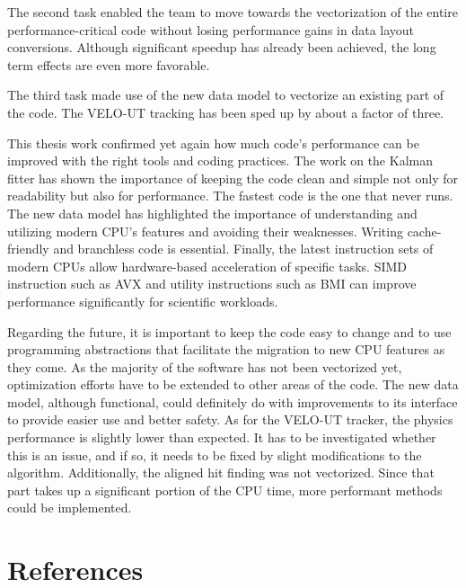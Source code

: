 \documentclass[12pt]{article}
\begin{document}
The second task enabled the team to move towards the vectorization of the entire performance-critical code without losing performance gains in data layout conversions. Although significant speedup has already been achieved, the long term effects are even more favorable.

The third task made use of the new data model to vectorize an existing part of the code. The VELO-UT tracking has been sped up by about a factor of three.
\vspace{1pc}

This thesis work confirmed yet again how much code's performance can be improved with the right tools and coding practices. The work on the Kalman fitter has shown the importance of keeping the code clean and simple not only for readability but also for performance. The fastest code is the one that never runs. The new data model has highlighted the importance of understanding and utilizing modern CPU's features and avoiding their weaknesses. Writing cache-friendly and branchless code is essential. Finally, the latest instruction sets of modern CPUs allow hardware-based acceleration of specific tasks. SIMD instruction such as AVX and utility instructions such as BMI can improve performance significantly for scientific workloads.
\vspace{1pc}

Regarding the future, it is important to keep the code easy to change and to use programming abstractions that facilitate the migration to new CPU features as they come. As the majority of the software has not been vectorized yet, optimization efforts have to be extended to other areas of the code. The new data model, although functional, could definitely do with improvements to its interface to provide easier use and better safety.
As for the VELO-UT tracker, the physics performance is slightly lower than expected. It has to be investigated whether this is an issue, and if so, it needs to be fixed by slight modifications to the algorithm. Additionally, the aligned hit finding was not vectorized. Since that part takes up a significant portion of the CPU time, more performant methods could be implemented.



\newpage
\section*{References}
\end{document}
